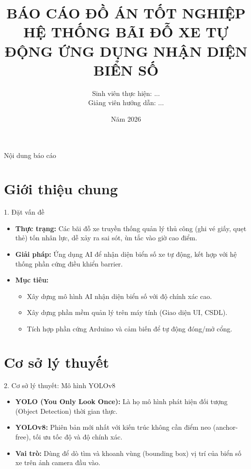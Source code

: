 \documentclass[aspectratio=43,10pt]{beamer}
\title[Hệ thống bãi đỗ xe tự động]{BÁO CÁO ĐỒ ÁN TỐT NGHIỆP\\HỆ THỐNG BÃI ĐỖ XE TỰ ĐỘNG ỨNG DỤNG NHẬN DIỆN BIỂN SỐ}
\author[Sinh viên thực hiện]{Sinh viên thực hiện: ...\\Giảng viên hướng dẫn: ...}
\institute[KHOA CNTT]{KHOA CÔNG NGHỆ THÔNG TIN\\TRƯỜNG ĐẠI HỌC ...}
\date{Năm 2026}
\begin{document}
\begin{frame}
    \titlepage
\end{frame}

\begin{frame}{Nội dung báo cáo}
    \tableofcontents
\end{frame}

\section{Giới thiệu chung}
\begin{frame}{1. Đặt vấn đề}
    \begin{itemize}
        \item \textbf{Thực trạng:} Các bãi đỗ xe truyền thống quản lý thủ công (ghi vé giấy, quẹt thẻ) tốn nhân lực, dễ xảy ra sai sót, ùn tắc vào giờ cao điểm.
        \item \textbf{Giải pháp:} Ứng dụng AI để nhận diện biển số xe tự động, kết hợp với hệ thống phần cứng điều khiển barrier.
        \item \textbf{Mục tiêu:}
        \begin{itemize}
            \item Xây dựng mô hình AI nhận diện biển số với độ chính xác cao.
            \item Xây dựng phần mềm quản lý trên máy tính (Giao diện UI, CSDL).
            \item Tích hợp phần cứng Arduino và cảm biến để tự động đóng/mở cổng.
        \end{itemize}
    \end{itemize}
\end{frame}

\section{Cơ sở lý thuyết}
\begin{frame}{2. Cơ sở lý thuyết: Mô hình YOLOv8}
    \begin{itemize}
        \item \textbf{YOLO (You Only Look Once):} Là họ mô hình phát hiện đối tượng (Object Detection) thời gian thực.
        \item \textbf{YOLOv8:} Phiên bản mới nhất với kiến trúc không cần điểm neo (anchor-free), tối ưu tốc độ và độ chính xác.
        \item \textbf{Vai trò:} Dùng để dò tìm và khoanh vùng (bounding box) vị trí của biển số xe trên ảnh camera đầu vào.
    \end{itemize}
\end{frame}
\end{document}

